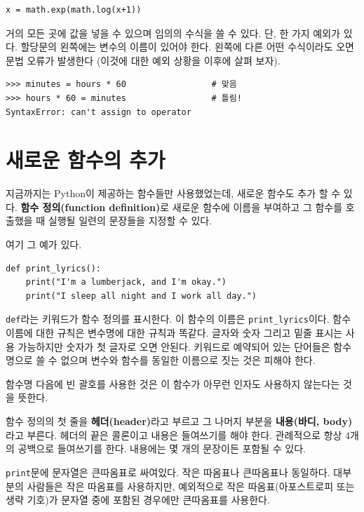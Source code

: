 \documentclass[10pt]{book}
\begin{document}
\begin{verbatim}
x = math.exp(math.log(x+1))
\end{verbatim}
%
거의 모든 곳에 값을 넣을 수 있으며 임의의 수식을 쓸 수 있다.  단, 한
가지 예외가 있다.  할당문의 왼쪽에는 변수의 이름이 있어야 한다.
왼쪽에 다른 어떤 수식이라도 오면 문법 오류가 발생한다 (이것에
대한 예외 상황을 이후에 살펴 보자).


\begin{verbatim}
>>> minutes = hours * 60                 # 맞음
>>> hours * 60 = minutes                 # 틀림!
SyntaxError: can't assign to operator
\end{verbatim}
%


\section{새로운 함수의 추가}

지금까지는 Python이 제공하는 함수들만 사용했었는데, 새로운 함수도 추가
할 수 있다.  {\bf 함수 정의(function definition)}로 새로운 함수에
이름을 부여하고 그 함수를 호출했을 때 실행될 일련의 문장들을 지정할 수
있다.  

여기 그 예가 있다.

\begin{verbatim}
def print_lyrics():
    print("I'm a lumberjack, and I'm okay.")
    print("I sleep all night and I work all day.")
\end{verbatim}
%
{\tt def}라는 키워드가 함수 정의를 표시한다.  이 함수의 이름은
\verb"print_lyrics"이다.  함수 이름에 대한 규칙은 변수명에 대한 규칙과
똑같다.  글자와 숫자 그리고 밑줄 표시는 사용 가능하지만 숫자가 첫
글자로 오면 안된다.  키워드로 예약되어 있는 단어들은 함수명으로 쓸 수
없으며 변수와 함수를 동일한 이름으로 짓는 것은 피해야 한다.

함수명 다음에 빈 괄호를 사용한 것은 이 함수가 아무런 인자도 사용하지
않는다는 것을 뜻한다.

함수 정의의 첫 줄을 {\bf 헤더(header)}라고 부르고 그 나머지 부분을
{\bf 내용(바디, body)}라고 부른다.  헤더의 끝은 콜론이고 내용은
들여쓰기를 해야 한다.  관례적으로 항상 4개의 공백으로 들여쓰기를 한다.
내용에는 몇 개의 문장이든 포함될 수 있다.


\texttt{print}문에 문자열은 큰따옴표로 싸여있다. 작은 따옴표나
큰따옴표나 동일하다.  대부분의 사람들은 작은 따옴표를 사용하지만,
예외적으로 작은 따옴표(아포스트로피 또는 생략 기호)가 문자열 중에
포함된 경우에만 큰따옴표를 사용한다.
\end{document}

